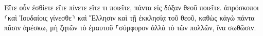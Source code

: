 \documentclass{openreader}
\begin{document}
Εἴτε οὖν ἐσθίετε εἴτε πίνετε εἴτε τι ποιεῖτε, πάντα εἰς δόξαν θεοῦ ποιεῖτε. 
ἀπρόσκοποι ⸂καὶ Ἰουδαίοις γίνεσθε⸃ καὶ Ἕλλησιν καὶ τῇ ἐκκλησίᾳ τοῦ θεοῦ, 
καθὼς κἀγὼ πάντα πᾶσιν ἀρέσκω, μὴ ζητῶν τὸ ἐμαυτοῦ ⸀σύμφορον ἀλλὰ τὸ τῶν πολλῶν, ἵνα σωθῶσιν. 
\end{document}

